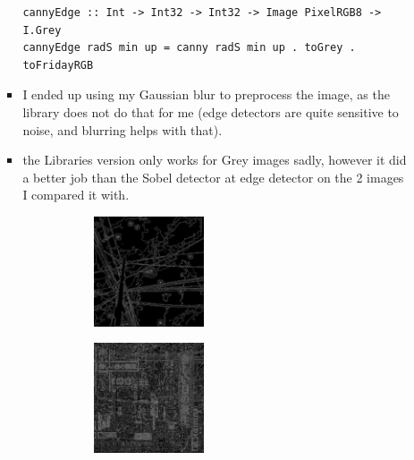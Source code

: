 \documentclass{article}
\begin{document}
\begin{enumerate}
\begin{enumerate}
\begin{itemize}
\begin{verbatim}
cannyEdge :: Int -> Int32 -> Int32 -> Image PixelRGB8 -> I.Grey
cannyEdge radS min up = canny radS min up . toGrey . toFridayRGB
\end{verbatim}
\item I ended up using my Gaussian blur to preprocess the image, as the
library does not do that for me (edge detectors are quite sensitive to
noise, and blurring helps with that).
\item the Libraries version only works for Grey images sadly, however it
did a better job than the Sobel detector at edge detector on the 2
images I compared it with.
\begin{figure}
  \centering
  \begin{subfigure}
    \centering
    \includegraphics[width=0.45\textwidth]{../data/grey-wires-canny-5-120-300.png}
  \end{subfigure}%
  \begin{subfigure}
    \centering
    \includegraphics[width=0.45\textwidth]{../data/grey-canny-5-120-300.png}
  \end{subfigure}


\end{figure}
\end{itemize}
\end{enumerate}
\end{enumerate}
\end{document}
